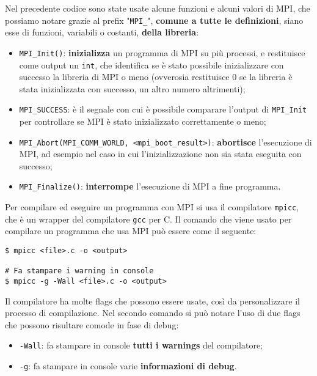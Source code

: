 Nel precedente codice sono state usate alcune funzioni e alcuni valori di MPI, che possiamo notare grazie al prefix "\texttt{MPI\_}", \textbf{comune a tutte le definizioni}, siano esse di funzioni, variabili o costanti, \textbf{della libreria}:
\begin{itemize}
    \item \verb|MPI_Init()|: \textbf{inizializza} un programma di MPI su più processi, e restituisce come output un \texttt{int}, che identifica se è stato possibile inizializzare con successo la libreria di MPI o meno (ovverosia restituisce 0 se la libreria è stata inizializzata con successo, un altro numero altrimenti);
    \item \verb|MPI_SUCCESS|: è il segnale con cui è possibile comparare l'output di \verb|MPI_Init| per controllare se MPI è stato inizializzato correttamente o meno;
    \item \verb|MPI_Abort(MPI_COMM_WORLD, <mpi_boot_result>)|: \textbf{abortisce} l'esecuzione di MPI, ad esempio nel caso in cui l'inizializzazione non sia stata eseguita con successo;
    \item \verb|MPI_Finalize()|: \textbf{interrompe} l'esecuzione di MPI a fine programma.
\end{itemize}

Per compilare ed eseguire un programma con MPI si usa il compilatore \texttt{mpicc}, che è un wrapper del compilatore \texttt{gcc} per C. Il comando che viene usato per compilare un programma che usa MPI può essere come il seguente:

\begin{terminal}
    \begin{lstlisting}[style = notexterm]
$ mpicc <file>.c -o <output>

# Fa stampare i warning in console
$ mpicc -g -Wall <file>.c -o <output>\end{lstlisting}
\end{terminal}

Il compilatore ha molte flags che possono essere usate, così da personalizzare il processo di compilazione. Nel secondo comando si può notare l'uso di due flags che possono risultare comode in fase di debug:
\begin{itemize}
    \item \verb|-Wall|: fa stampare in console \textbf{tutti i warnings} del compilatore;
    \item \verb|-g|: fa stampare in console varie \textbf{informazioni di debug}.
\end{itemize}


